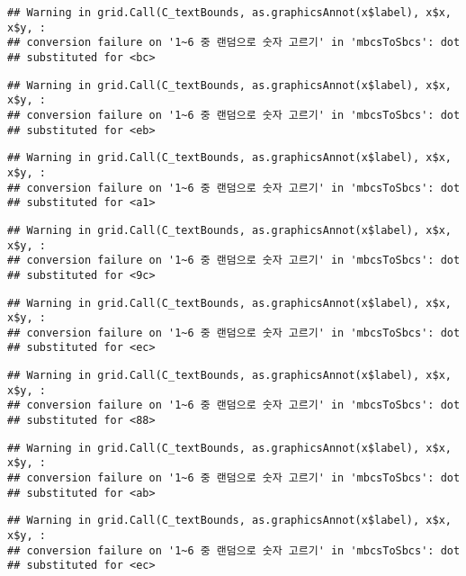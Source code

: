 \documentclass[]{book}
\begin{document}
\begin{verbatim}
## Warning in grid.Call(C_textBounds, as.graphicsAnnot(x$label), x$x, x$y, :
## conversion failure on '1~6 중 랜덤으로 숫자 고르기' in 'mbcsToSbcs': dot
## substituted for <bc>
\end{verbatim}

\begin{verbatim}
## Warning in grid.Call(C_textBounds, as.graphicsAnnot(x$label), x$x, x$y, :
## conversion failure on '1~6 중 랜덤으로 숫자 고르기' in 'mbcsToSbcs': dot
## substituted for <eb>
\end{verbatim}

\begin{verbatim}
## Warning in grid.Call(C_textBounds, as.graphicsAnnot(x$label), x$x, x$y, :
## conversion failure on '1~6 중 랜덤으로 숫자 고르기' in 'mbcsToSbcs': dot
## substituted for <a1>
\end{verbatim}

\begin{verbatim}
## Warning in grid.Call(C_textBounds, as.graphicsAnnot(x$label), x$x, x$y, :
## conversion failure on '1~6 중 랜덤으로 숫자 고르기' in 'mbcsToSbcs': dot
## substituted for <9c>
\end{verbatim}

\begin{verbatim}
## Warning in grid.Call(C_textBounds, as.graphicsAnnot(x$label), x$x, x$y, :
## conversion failure on '1~6 중 랜덤으로 숫자 고르기' in 'mbcsToSbcs': dot
## substituted for <ec>
\end{verbatim}

\begin{verbatim}
## Warning in grid.Call(C_textBounds, as.graphicsAnnot(x$label), x$x, x$y, :
## conversion failure on '1~6 중 랜덤으로 숫자 고르기' in 'mbcsToSbcs': dot
## substituted for <88>
\end{verbatim}

\begin{verbatim}
## Warning in grid.Call(C_textBounds, as.graphicsAnnot(x$label), x$x, x$y, :
## conversion failure on '1~6 중 랜덤으로 숫자 고르기' in 'mbcsToSbcs': dot
## substituted for <ab>
\end{verbatim}

\begin{verbatim}
## Warning in grid.Call(C_textBounds, as.graphicsAnnot(x$label), x$x, x$y, :
## conversion failure on '1~6 중 랜덤으로 숫자 고르기' in 'mbcsToSbcs': dot
## substituted for <ec>
\end{verbatim}
\end{document}
